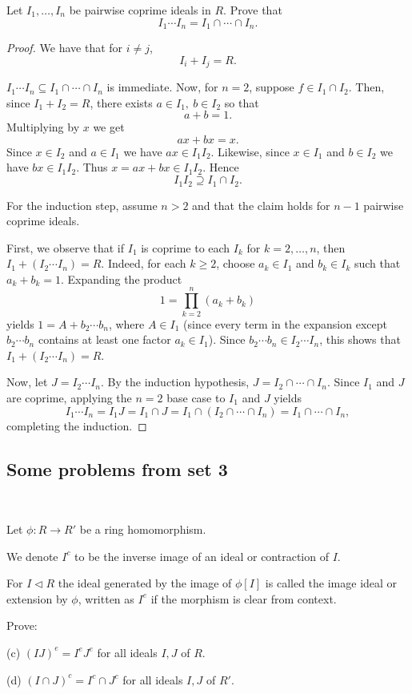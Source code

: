 \documentclass[11pt]{article}
\begin{document}
\begin{prob}
    Let $I_1,\ldots,I_n$ be pairwise coprime ideals 
    in $R$. Prove that 
    \[
        I_1\cdots I_n = I_1 \cap \cdots \cap I_n. 
    \]
\end{prob}
\begin{proof}
    We have that for $i \neq j$, 
    \[
        I_i + I_j = R.
    \]

    $I_1 \cdots I_n \subseteq I_1 \cap \cdots \cap I_n$ is immediate. 
    Now, for $n = 2$, suppose $f \in I_1 \cap I_2$. 
    Then, since $I_1 + I_2 = R$, there exists $a \in I_1, \ b \in I_2$
    so that 
    \[
        a+b = 1. 
    \]
    Multiplying by $x$ we get 
    \[
        ax+bx = x. 
    \]
    Since $x \in I_2$ and $a \in I_1$ we have 
    $ax \in I_1I_2$. Likewise, since $x \in I_1$ and $b \in I_2$ 
    we have $bx \in I_1I_2$. 
    Thus $x = ax + bx \in I_1I_2$. Hence 
    \[
        I_1I_2 \supseteq I_1\cap I_2. 
    \]

    For the induction step, assume $n > 2$ and that the claim 
    holds for $n - 1$ pairwise coprime ideals. 

    First, we observe that if $I_1$ is coprime to each $I_k$ for 
    $k = 2, \ldots, n$, then $I_1 + (I_2 \cdots I_n) = R$. Indeed, 
    for each $k \ge 2$, choose $a_k \in I_1$ and $b_k \in I_k$ such 
    that $a_k + b_k = 1$. Expanding the product 
    \[
        1 = \prod_{k=2}^n (a_k + b_k)
    \]
    yields $1 = A + b_2 \cdots b_n$, where $A \in I_1$ 
    (since every term in the expansion except $b_2 \cdots b_n$ 
    contains at least one factor $a_k \in I_1$). 
    Since $b_2 \cdots b_n \in I_2 \cdots I_n$, this shows that 
    $I_1 + (I_2 \cdots I_n) = R$.

    Now, let $J = I_2 \cdots I_n$. By the induction hypothesis, 
    $J = I_2 \cap \cdots \cap I_n$. Since $I_1$ and $J$ are coprime, 
    applying the $n = 2$ base case to $I_1$ and $J$ yields
    \[
        I_1 \cdots I_n = I_1 J = I_1 \cap J = I_1 \cap (I_2 \cap 
        \cdots \cap I_n) = I_1 \cap \cdots \cap I_n,
    \]
    completing the induction.
\end{proof}

\subsection{Some problems from set 3}

\begin{prob}[Gathmann 1.19]
    \medskip 
    \  

    Let $\phi : R \to R'$ be a ring homomorphism. 

    We denote $I^c$ to be the inverse image of an 
    ideal or contraction of $I$. 

    For $I \triangleleft R$ the ideal generated 
    by the image of $\phi[I]$ is called the image 
    ideal or extension by $\phi$, written as 
    $I^e$ if the morphism is clear from context. 

    Prove: 

    (c) $(IJ)^e = I^eJ^e$ for all ideals $I,J$ of $R$. 
    
    (d) $(I\cap J)^c = I^c \cap J^c$ for all ideals 
    $I,J$ of $R'$. 
\end{prob}
\end{document}
